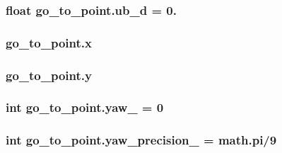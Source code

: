 \subsubsection[{\texorpdfstring{ub\+\_\+d}{ub_d}}]{\setlength{\rightskip}{0pt plus 5cm}float go\+\_\+to\+\_\+point.\+ub\+\_\+d = 0.}\hypertarget{namespacego__to__point_a16c473b9e717200c483d18e66b48152a}{}\label{namespacego__to__point_a16c473b9e717200c483d18e66b48152a}
\subsubsection[{\texorpdfstring{x}{x}}]{\setlength{\rightskip}{0pt plus 5cm}go\+\_\+to\+\_\+point.\+x}\hypertarget{namespacego__to__point_a328c9a3bb9322f150f2e67371cd73306}{}\label{namespacego__to__point_a328c9a3bb9322f150f2e67371cd73306}
\subsubsection[{\texorpdfstring{y}{y}}]{\setlength{\rightskip}{0pt plus 5cm}go\+\_\+to\+\_\+point.\+y}\hypertarget{namespacego__to__point_ac372e1a492f9aa66d29f365cc1c57d8c}{}\label{namespacego__to__point_ac372e1a492f9aa66d29f365cc1c57d8c}
\subsubsection[{\texorpdfstring{yaw\+\_\+}{yaw_}}]{\setlength{\rightskip}{0pt plus 5cm}int go\+\_\+to\+\_\+point.\+yaw\+\_\+ = 0}\hypertarget{namespacego__to__point_ae444f19eb2019982432760ace036ce03}{}\label{namespacego__to__point_ae444f19eb2019982432760ace036ce03}
\subsubsection[{\texorpdfstring{yaw\+\_\+precision\+\_\+}{yaw_precision_}}]{\setlength{\rightskip}{0pt plus 5cm}int go\+\_\+to\+\_\+point.\+yaw\+\_\+precision\+\_\+ = math.\+pi/9}\hypertarget{namespacego__to__point_a67f95834f0959feb3facd17bc7fa2b38}{}\label{namespacego__to__point_a67f95834f0959feb3facd17bc7fa2b38}
